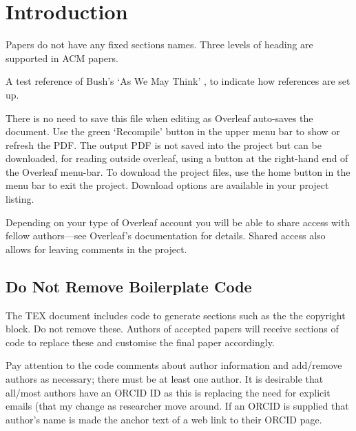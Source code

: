 \documentclass[sigconf]{acmart}
\begin{document}


\maketitle

\section{Introduction}
Papers do not have any fixed sections names. Three levels of heading are supported in ACM papers.

A test reference of Bush's `As We May Think' \cite{bush:1945:awmt}, to indicate how references are set up.

There is no need to save this file when editing as Overleaf auto-saves the document. Use the green `Recompile' button in the upper menu bar to show or refresh the PDF. The output PDF is not saved into the project but can be downloaded, for reading outside overleaf, using a button at the right-hand end of the Overleaf menu-bar. To download the project files, use the home button in the menu bar to exit the project. Download options are available in your project listing.

Depending on your type of Overleaf account you will be able to share access with fellow authors---see Overleaf's documentation for details. Shared access also allows for leaving comments in the project.

\subsection{Do Not Remove Boilerplate Code}
The TEX document includes code to generate sections such as the the copyright block. Do not remove these. Authors of accepted papers will receive sections of code to replace these and customise the final paper accordingly.

Pay attention to the code comments about author information and add/remove authors as necessary; there must be at least one author. It is desirable that all/most authors have an ORCID ID as this is replacing the need for explicit emails (that my change as researcher move around. If an ORCID is supplied that author's name is made the anchor text of a web link to their ORCID page. 
\end{document}
